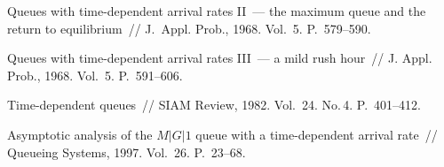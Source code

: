 \begin{multicols}{2}
{{\begin{thebibliography}{9}
Queues with time-dependent arrival rates II~--- the maximum queue and the return to equilibrium~// 
\mbox{J.~Appl.} Prob., 1968. Vol.~5. P.~579--590.

Queues with time-dependent arrival rates III~--- a mild rush hour~// J. Appl. Prob., 1968. Vol.~5. P.~591--606.

Time-dependent queues~// SIAM Review, 1982. Vol.~24. No.\,4. P.~401--412.

\label{end\stat}

Asymptotic analysis of the $M\vert G\vert 1$ queue with a time-dependent arrival rate~// 
Queueing Systems, 1997. Vol.~26. P.~23--68.
 \end{thebibliography}
}
}
\end{multicols}
